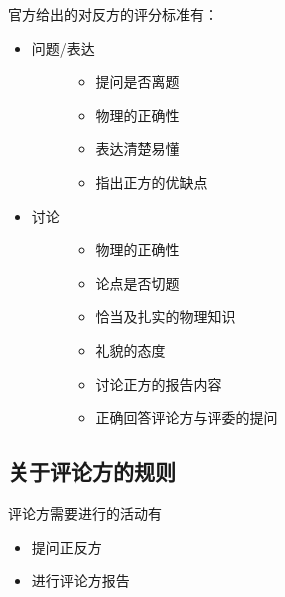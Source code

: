 \documentclass[a4paper,10pt,english]{sphinxmanual}
\begin{document}
官方给出的对反方的评分标准有：
\begin{itemize}
\item {} \begin{description}
\item[{问题/表达}] \leavevmode\begin{itemize}
\item {} 
提问是否离题

\item {} 
物理的正确性

\item {} 
表达清楚易懂

\item {} 
指出正方的优缺点

\end{itemize}

\end{description}

\item {} \begin{description}
\item[{讨论}] \leavevmode\begin{itemize}
\item {} 
物理的正确性

\item {} 
论点是否切题

\item {} 
恰当及扎实的物理知识

\item {} 
礼貌的态度

\item {} 
讨论正方的报告内容

\item {} 
正确回答评论方与评委的提问

\end{itemize}

\end{description}

\end{itemize}


\subsection{关于评论方的规则}
\label{\detokenize{6. Tournament:id5}}
评论方需要进行的活动有
\begin{itemize}
\item {} 
提问正反方

\item {} 
进行评论方报告

\end{itemize}
\end{document}
